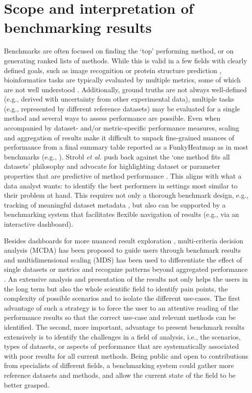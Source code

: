 \documentclass[11pt]{article}
\begin{document}
\section*{Scope and interpretation of benchmarking results}

Benchmarks are often focused on finding the `top' performing method, or on generating ranked lists of methods. While this is valid in a few fields with clearly defined goals, such as image recognition \cite{Khan2018-ot} or protein structure prediction \cite{Jumper2021-oq}, bioinformatics tasks are typically evaluated by multiple metrics, some of which are not well understood \cite{Lutge2021-mt, Reinke2024-dw}. Additionally, ground truths are not always well-defined (e.g., derived with uncertainty from other experimental data), multiple tasks (e.g., represented by different reference datasets) may be evaluated for a single method and several ways to assess performance are possible. Even when accompanied by dataset- and/or metric-specific performance measures, scaling and aggregation of results make it difficult to unpack fine-grained nuances of performance from a final summary table reported as a FunkyHeatmap \cite{funkyheatmap} as in most benchmarks (e.g., \cite{Saelens2019-jy}). Strobl \textit{et al.} push back against the `one method fits all datasets’ philosophy and advocate for highlighting dataset or parameter properties that are predictive of method performance \cite{Jelizarow2010-kr, Boulesteix2010-zj, Strobl2024-lp}. This aligns with what a data analyst wants: to identify the best performers in settings most similar to their problem at hand. This requires not only a thorough benchmark design, e.g., tracking of meaningful dataset metadata \cite{Strobl2024-lp}, but also can be supported by a benchmarking system that facilitates flexible navigation of results (e.g., via an interactive dashboard). 

Besides dashboards for more nuanced result exploration \cite{MariniUnknown-aq}, multi-criteria decision analysis (MCDA) \cite{Taherdoost2023-wd} has been proposed to guide users through benchmark results and multidimensional scaling (MDS) has been used to differentiate the effect of single datasets or metrics and recognize patterns beyond aggregated performance \cite{Niessl2022-fk}. An extensive analysis and presentation of the results not only helps the users in the long term but also the whole scientific field to identify pain points, the complexity of possible scenarios and to isolate the different use-cases. The first advantage of such a strategy is to force the user to an attentive reading of the performance results so that the correct use-case and relevant methods can be identified. The second, more important, advantage to present benchmark results extensively is to identify the challenges in a field of analysis, i.e., the scenarios, types of datasets, or aspects of performance that are systematically associated with poor results for all current methods. Being public and open to contributions from specialists of different fields, a benchmarking system could gather more reference datasets and methods, and allow the current state of the field to be better grasped. 
\end{document}
